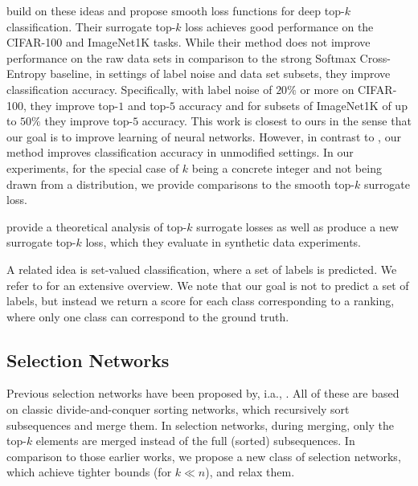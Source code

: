 \documentclass{article}
\newcommand{\revD}[1]{{#1}}
\begin{document}
\citet{berrada2018smooth} build on these ideas and propose smooth loss functions for deep top-$k$ classification.
Their surrogate top-$k$ loss achieves good performance on the CIFAR-100 and ImageNet1K tasks.
While their method does not improve performance on the raw data sets in comparison to the strong Softmax Cross-Entropy baseline, in settings of label noise and data set subsets, they improve classification accuracy.
Specifically, with label noise of $20\%$ or more on CIFAR-100, they improve top-$1$ and top-$5$ accuracy and for subsets of ImageNet1K of up to $50\%$ they improve top-$5$ accuracy.
This work is closest to ours in the sense that our goal is to improve learning of neural networks.
However, in contrast to \citep{berrada2018smooth}, our method improves classification accuracy in unmodified settings.
In our experiments, for the special case of $k$ being a concrete integer and not being drawn from a distribution, we provide comparisons to the smooth top-$k$ surrogate loss.

\citet{yang2020consistency} provide a theoretical analysis of top-$k$ surrogate losses 
as well as produce a new surrogate top-$k$ loss, which they evaluate in synthetic data experiments.

\revD{A related idea is set-valued classification, where a set of labels is predicted. We refer to \citet{chzhen2021set} for an extensive overview. We note that our goal is not to predict a set of labels, but instead we return a score for each class corresponding to a ranking, where only one class can correspond to the ground truth.}

\subsection{Selection Networks}

Previous selection networks have been proposed by, i.a., \citep{Wah_and_Chen_1984,Zazon-Ivry_and_Codish_2012,Karpinski_and_Piotrow_2015}.
All of these are based on classic divide-and-conquer sorting networks, which recursively sort subsequences and merge them. 
In selection networks, during merging, only the top-$k$ elements are merged instead of the full (sorted) subsequences.
In comparison to those earlier works, we propose a new class of selection networks, which achieve tighter bounds (for $k\ll n$), and relax them.
\end{document}
